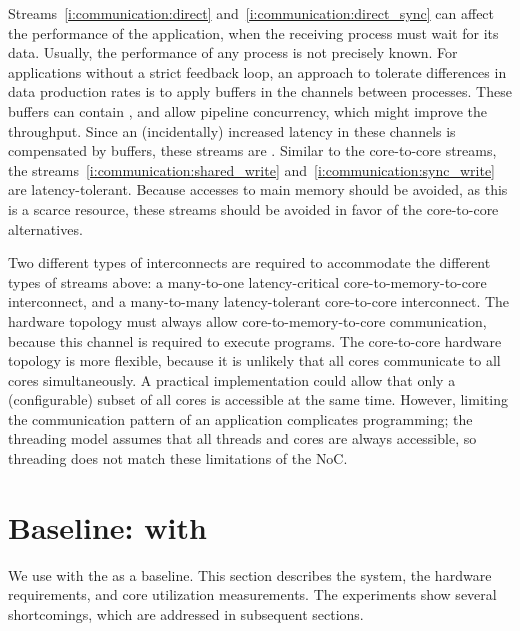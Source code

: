 Streams~\ref{i:communication:direct} and~\ref{i:communication:direct_sync} can affect the performance of the application, when the receiving process must wait for its data.
Usually, the performance of any process is not precisely known.
For applications without a strict feedback loop, an approach to tolerate differences in data production rates is to apply buffers in the channels between processes.
These buffers can contain , and allow pipeline concurrency, which might improve the throughput.
Since an (incidentally) increased latency in these channels is compensated by buffers, these streams are \emph{}.
Similar to the core-to-core streams, the streams~\ref{i:communication:shared_write} and~\ref{i:communication:sync_write} are latency-tolerant.
Because accesses to main memory should be avoided, as this is a scarce resource, these streams should be avoided in favor of the core-to-core alternatives.

Two different types of interconnects are required to accommodate the different types of streams above: a many-to-one latency-critical core-to-memory-to-core interconnect, and a many-to-many latency-tolerant core-to-core interconnect.
The hardware topology must always allow core-to-memory-to-core communication, because this channel is required to execute programs.
The core-to-core hardware topology is more flexible, because it is unlikely that all cores communicate to all cores simultaneously.
A practical implementation could allow that only a (configurable) subset of all cores is accessible at the same time.
However, limiting the communication pattern of an application complicates programming; the threading model assumes that all threads and cores are always accessible, so threading does not match these limitations of the \ac{NoC}.



\section{Baseline: \Starburst with \AEthereal}
\label{s:hardware:ae}

We use \Starburst* with the \aethereal {} as a baseline.
This section describes the system, the hardware requirements, and core utilization measurements.
The experiments show several shortcomings, which are addressed in subsequent sections.

